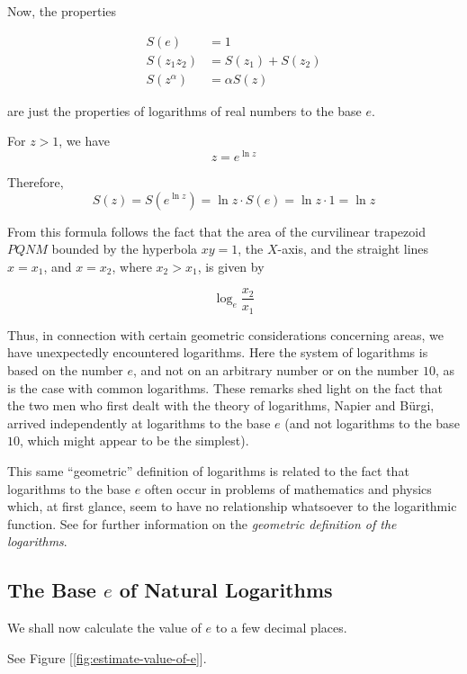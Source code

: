 \documentclass[11pt]{article}
\theoremstyle{definition}
\theoremstyle{plain}
\theoremstyle{problemstyle}
\theoremstyle{remark}
\theoremstyle{definition}
\begin{document}
Now, the properties

\begin{equation}
\label{eq:sz-like-ln}
\begin{aligned}
    S(e)&=1\\
    S(z_1z_2)&=S(z_1)+S(z_2)\\
    S(z^\alpha)&=\alpha S(z)
\end{aligned}
\end{equation}

are just the properties of logarithms of real numbers to the base $e$.

For $z>1$, we have 
\[
    z=e^{\ln{z}}
\]

Therefore,
\begin{equation}
\label{eq:sz-is-ln}
    S(z)=S(e^{\ln{z}})=\ln{z}\cdot S(e)=\ln{z}\cdot 1=\ln{z}
\end{equation}

From this formula follows the fact that the area of the curvilinear trapezoid $PQNM$ bounded by the hyperbola $xy=1$, the $X$-axis, and the straight lines $x = x_1$, and $x = x_2$, where $x_2>x_1$, is given by

\[
    \log_e\frac{x_2}{x_1}
\]

Thus, in connection with certain geometric considerations concerning areas, we have unexpectedly encountered logarithms. Here the system of logarithms is based on the number $e$, and not on an arbitrary number or on the number $10$, as is the case with common logarithms. These remarks shed light on the fact that the two men who first dealt with the theory of logarithms, Napier and Bürgi, arrived independently at logarithms to the base $e$ (and not logarithms to the base $10$, which might appear to be the simplest).

This same ``geometric'' definition of logarithms is related to the fact that logarithms to the base $e$ often occur in problems of mathematics and physics which, at first glance, seem to have no relationship whatsoever to the logarithmic function. See \cite{markushevich} for further information on the \emph{geometric definition of the logarithms}.

\subsection{The Base $e$ of Natural Logarithms}

We shall now calculate the value of $e$ to a few decimal places.

See Figure [\ref{fig:estimate-value-of-e}].
\end{document}
